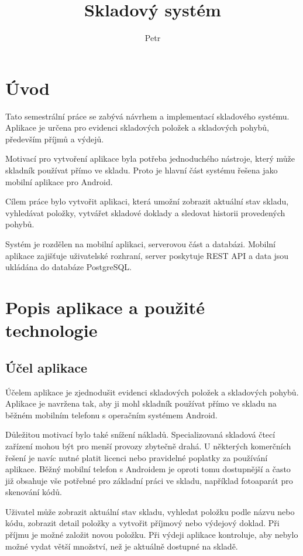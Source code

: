 \documentclass[czech, oth, kiv, he, pdf, viewonly]{fasthesis}
\title{Skladový systém}
\author{Petr}{Schöpp}{}{}
\begin{document}
\frontpages[notm]
\tableofcontents

\chapter{Úvod}

Tato semestrální práce se zabývá návrhem a implementací
skladového systému. Aplikace je určena pro evidenci skladových
položek a skladových pohybů, především příjmů a výdejů.

Motivací pro vytvoření aplikace byla potřeba jednoduchého nástroje,
který může skladník používat přímo ve skladu. Proto je hlavní část
systému řešena jako mobilní aplikace pro Android.

Cílem práce bylo vytvořit aplikaci, která umožní zobrazit aktuální
stav skladu, vyhledávat položky, vytvářet skladové doklady a sledovat
historii provedených pohybů.

Systém je rozdělen na mobilní aplikaci, serverovou část a databázi.
Mobilní aplikace zajišťuje uživatelské rozhraní, server poskytuje
REST API a data jsou ukládána do databáze PostgreSQL.

\chapter{Popis aplikace a použité technologie}

\section{Účel aplikace}

Účelem aplikace je zjednodušit evidenci skladových položek a
skladových pohybů. Aplikace je navržena tak, aby ji mohl skladník
používat přímo ve skladu na běžném mobilním telefonu s operačním
systémem Android.

Důležitou motivací bylo také snížení nákladů. Specializovaná skladová
čtecí zařízení mohou být pro menší provozy zbytečně drahá. U některých
komerčních řešení je navíc nutné platit licenci nebo pravidelné
poplatky za používání aplikace. Běžný mobilní telefon s Androidem je
oproti tomu dostupnější a často již obsahuje vše potřebné pro základní
práci ve skladu, například fotoaparát pro skenování kódů.

Uživatel může zobrazit aktuální stav skladu, vyhledat položku podle
názvu nebo kódu, zobrazit detail položky a vytvořit příjmový nebo
výdejový doklad. Při příjmu je možné založit novou položku. Při výdeji
aplikace kontroluje, aby nebylo možné vydat větší množství, než je
aktuálně dostupné na skladě.
\end{document}
